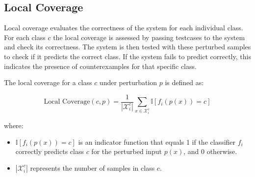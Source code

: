 \subsection{Local Coverage}

Local coverage evaluates the correctness of the system for each individual class. For each class $c$ the local coverage is assessed by passing testcases to the system and check its correctness. The system is then tested with these perturbed samples to check if it predicts the correct class. If the system fails to predict correctly, this indicates the presence of counterexamples for that specific class.

The local coverage for a class $c$ under perturbation $p$ is defined as:

\[
\text{Local Coverage}(c, p) = \frac{1}{|\mathcal{X}_i^c|} \sum_{x \in \mathcal{X}_i^c} \mathbb{I}[f_i(p(x)) = c]
\]

where:
\begin{itemize}
  \item $\mathbb{I}[f_i(p(x)) = c]$ is an indicator function that equals 1 if the classifier $f_i$ correctly predicts class $c$ for the perturbed input $p(x)$, and 0 otherwise.
  \item $|\mathcal{X}_i^c|$ represents the number of samples in class $c$.
\end{itemize}


